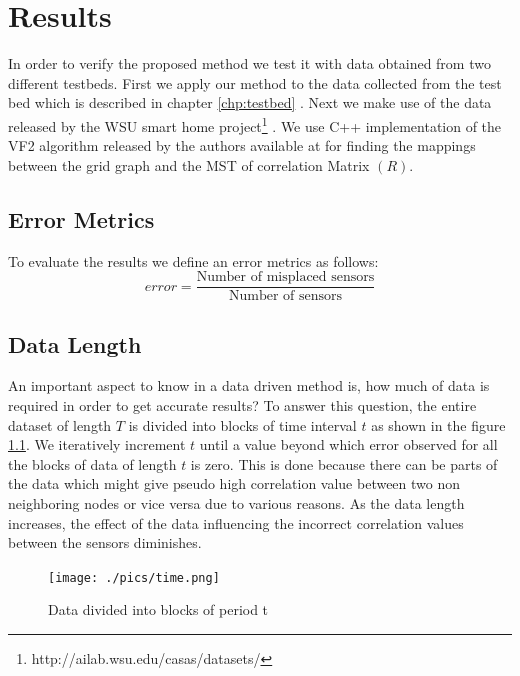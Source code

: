 \chapter{Results}
In order to verify the proposed method we test it with data obtained from two different testbeds. First we apply our method to the data collected from the test bed which is described in chapter \ref{chp:testbed} . Next we make use of the data released by the WSU smart home project\footnote{http://ailab.wsu.edu/casas/datasets/} \cite{cook2009assessing}. We use C++ implementation of the VF2 algorithm released by the authors available at \cite{vfLib} for finding the mappings between the grid graph and the MST of correlation Matrix $(R)$.
\section{Error Metrics }
To evaluate the results we define an error metrics as follows:\\
\begin{equation}
error=\frac{\text{Number of misplaced sensors}}{\text{Number of sensors}}
\end{equation}
\section{Data Length}
\label{sec:dataLength}
An important aspect to know in a data driven method is, how much of data is required in order to get accurate results? To answer this question, the entire dataset of length $T$ is divided into blocks of time interval $t$ as shown in the figure \ref{fig:time}. We iteratively increment $t$ until a value beyond which error observed for all the blocks of data of length $t$ is zero. 
This is done because there can be parts of the data which might give pseudo high correlation value between two non neighboring nodes or vice versa due to various reasons. As the data length increases, the effect of the data influencing the incorrect correlation values between the sensors diminishes.

\begin{figure}[!ht]
\texttt{[image: ./pics/time.png]}
\caption{Data divided into blocks of period t}
\label{fig:time}
\end{figure}

